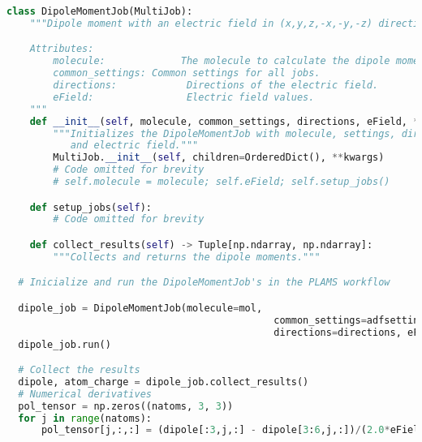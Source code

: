 
\begin{lstlisting}[language=Python, style=mystyle, basicstyle=\tiny]
class DipoleMomentJob(MultiJob):
    """Dipole moment with an electric field in (x,y,z,-x,-y,-z) directions.

    Attributes:
        molecule:             The molecule to calculate the dipole moment for.
        common_settings: Common settings for all jobs.
        directions:            Directions of the electric field.
        eField:                Electric field values.
    """
    def __init__(self, molecule, common_settings, directions, eField, **kwargs):
        """Initializes the DipoleMomentJob with molecule, settings, directions,
           and electric field."""
        MultiJob.__init__(self, children=OrderedDict(), **kwargs)
        # Code omitted for brevity
        # self.molecule = molecule; self.eField; self.setup_jobs()

    def setup_jobs(self):
        # Code omitted for brevity

    def collect_results(self) -> Tuple[np.ndarray, np.ndarray]:
        """Collects and returns the dipole moments."""

  # Inicialize and run the DipoleMomentJob's in the PLAMS workflow

  dipole_job = DipoleMomentJob(molecule=mol,
                                              common_settings=adfsettings,
                                              directions=directions, eField=eField)
  dipole_job.run()

  # Collect the results
  dipole, atom_charge = dipole_job.collect_results()
  # Numerical derivatives
  pol_tensor = np.zeros((natoms, 3, 3)) 
  for j in range(natoms):
      pol_tensor[j,:,:] = (dipole[:3,j,:] - dipole[3:6,j,:])/(2.0*eFieldmag)

\end{lstlisting}

